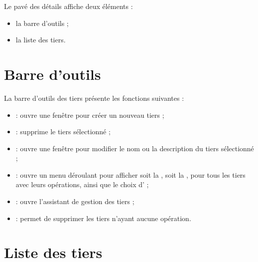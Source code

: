 Le pavé des détails affiche deux éléments :
\begin{itemize}
	 \item la barre d'outils ;
	 \item la liste des tiers.
\end{itemize}


\section{Barre d'outils\label{thirdparties-functions}}


La barre d'outils des tiers présente les fonctions suivantes  :

\begin{itemize}
	 \item {} : ouvre une fenêtre pour créer un nouveau tiers ;
	 \item {} : supprime le tiers sélectionné ;
	 \item {} : ouvre une fenêtre pour modifier le nom ou la description du tiers sélectionné ;
	 \item {} : ouvre un menu déroulant pour afficher soit la , soit la , pour tous les tiers avec leurs opérations, ainsi que le choix d' ;
	 \item {} : ouvre l'assistant de gestion des tiers ;
	 \item {} : permet de supprimer les tiers n'ayant aucune opération.
\end{itemize}



\section{Liste des tiers\label{thirdparties-list}}



